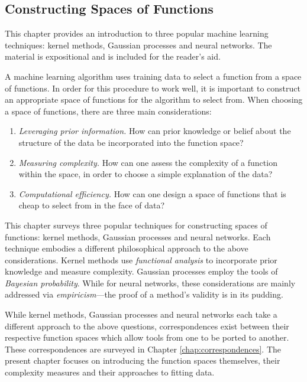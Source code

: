 \begin{refsection}

\chapter{Constructing Spaces of Functions}
\label{chap:functionspaces}

\begin{tcolorbox}
This chapter provides an introduction to three popular machine learning techniques: kernel methods, Gaussian processes and neural networks. The material is expositional and is included for the reader's aid.
\end{tcolorbox}

A machine learning algorithm uses training data to select a function from a space of functions. In order for this procedure to work well, it is important to construct an appropriate space of functions for the algorithm to select from. When choosing a space of functions, there are three main considerations:
\begin{enumerate}
    \item \textit{Leveraging prior information.} How can prior knowledge or belief about the structure of the data be incorporated into the function space?
    
    \item \textit{Measuring complexity.} How can one assess the complexity of a function within the space, in order to choose a simple explanation of the data?
    
    \item \textit{Computational efficiency.} How can one design a space of functions that is cheap to select from in the face of data?
\end{enumerate}

This chapter surveys three popular techniques for constructing spaces of functions: kernel methods, Gaussian processes and neural networks. Each technique embodies a different philosophical approach to the above considerations. Kernel methods use \textit{functional analysis} to incorporate prior knowledge and measure complexity. Gaussian processes employ the tools of \textit{Bayesian probability}. While for neural networks, these considerations are mainly addressed via \textit{empiricism}---the proof of a method's validity is in its pudding.

While kernel methods, Gaussian processes and neural networks each take a different approach to the above questions, correspondences exist between their respective function spaces which allow tools from one to be ported to another. These correspondences are surveyed in Chapter \ref{chap:correspondences}. The present chapter focuses on introducing the function spaces themselves, their complexity measures and their approaches to fitting data.


\end{refsection}
